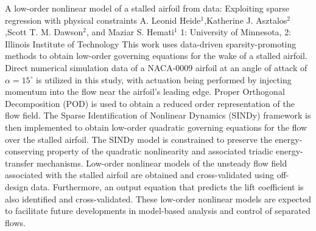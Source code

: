 \vspace{1.5ex}
\abs
{A low-order nonlinear model of a stalled airfoil from data: Exploiting sparse regression with physical constraints}
{A. Leonid Heide$^{1}$,Katherine J. Asztalos$^{2}$,Scott T. M. Dawson$^{2}$, and Maziar S. Hemati$^{1}$}
{1: University of Minnesota, 2: Illinois Institute of Technology}
{This work uses data-driven sparsity-promoting methods to obtain low-order governing equations for the wake of a stalled airfoil. 
Direct numerical simulation data of a NACA-0009 airfoil at an angle of attack of $\alpha=15^{\circ}$ is utilized in this study, with actuation being performed by injecting momentum into the flow near the airfoil’s leading edge. 
Proper Orthogonal Decomposition (POD) is used to obtain a reduced order representation of the flow field.
The Sparse Identification of Nonlinear Dynamics (SINDy) framework is then implemented to obtain low-order quadratic governing equations for the  flow over the stalled airfoil.
The SINDy model is constrained to preserve the energy-conserving property of the quadratic nonlinearity and associated triadic energy-transfer mechanisms. 
Low-order nonlinear models of the unsteady flow field associated with the stalled airfoil are obtained and cross-validated using off-design data. 
Furthermore, an output equation that predicts the lift coefficient is also identified and cross-validated.
These low-order nonlinear models are expected to facilitate future developments in model-based analysis and control of separated flows.}


